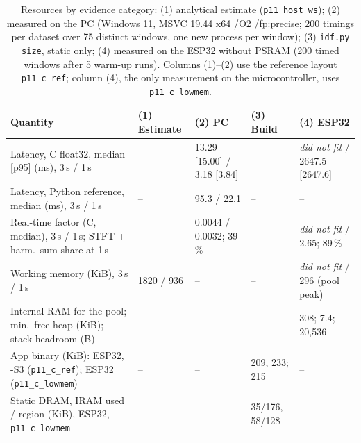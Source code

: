 
\begin{table}[t]
\centering
\scriptsize
\setlength{\tabcolsep}{4pt}
\caption{Resources by evidence category: (1) analytical estimate (\texttt{p11\_host\_ws}); (2) measured on the PC (Windows 11, MSVC 19.44 x64 \slash{}O2 \slash{}fp:precise; 200 timings per dataset over 75 distinct windows, one new process per window); (3) \texttt{idf.py size}, static only; (4) measured on the ESP32 without PSRAM (200 timed windows after 5 warm-up runs). Columns (1)--(2) use the reference layout \texttt{p11\_c\_ref}; column (4), the only measurement on the microcontroller, uses \texttt{p11\_c\_lowmem}.}
\label{tab:resources}
\begin{tabular}{@{}lllll@{}}
\toprule
Quantity & (1) Estimate & (2) PC & (3) Build & (4) ESP32 \\
\midrule
Latency, C float32, median [p95] (ms), 3\,s / 1\,s & -- & 13.29 [15.00] / 3.18 [3.84] & -- & \textit{did not fit} / 2647.5 [2647.6] \\
Latency, Python reference, median (ms), 3\,s / 1\,s & -- & 95.3 / 22.1 & -- & -- \\
Real-time factor (C, median), 3\,s / 1\,s; STFT + harm.\ sum share at 1\,s & -- & 0.0044 / 0.0032; 39\,\% & -- & \textit{did not fit} / 2.65; 89\,\% \\
Working memory (KiB), 3\,s / 1\,s & 1820 / 936 & -- & -- & \textit{did not fit} / 296 (pool peak) \\
Internal RAM for the pool; min.\ free heap (KiB); stack headroom (B) & -- & -- & -- & 308; 7.4; 20{,}536 \\
App binary (KiB): ESP32, -S3 (\texttt{p11\_c\_ref}); ESP32 (\texttt{p11\_c\_lowmem}) & -- & -- & 209, 233; 215 & -- \\
Static DRAM, IRAM used / region (KiB), ESP32, \texttt{p11\_c\_lowmem} & -- & -- & 35/176, 58/128 & -- \\
\bottomrule
\end{tabular}
\end{table}
